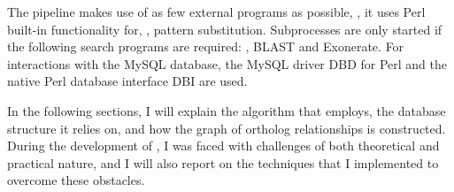 The pipeline makes use of as few external programs as possible, \ie, it
uses Perl built-in functionality for, \eg, pattern substitution. Subprocesses
are only started if the following search programs are required: ,
BLAST and Exonerate. For interactions with the MySQL database, the MySQL driver
DBD for Perl and the native Perl database interface DBI are used.

In the following sections, I will explain the algorithm that \pname employs, the
database structure it relies on, and how the graph of ortholog relationships is
constructed. During the development of \pname, I was faced with challenges of
both theoretical and practical nature, and I will also report on the techniques
that I implemented to overcome these obstacles.

